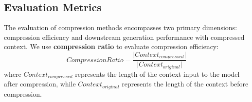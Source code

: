 








\subsection{Evaluation Metrics}
The evaluation of compression methods encompasses two primary dimensions: compression efficiency and downstream generation performance with compressed context. 
We use \textbf{compression ratio} to evaluate compression efficiency:
\begin{equation}
Compression Ratio = \frac{\lvert{Context_{compressed}}\rvert}{\lvert{Context_{original}}\rvert}
\end{equation}
where $Context_{compressed}$ represents the length of the context input to the model after compression,  
while $Context_{original}$ represents the length of the context before compression.

